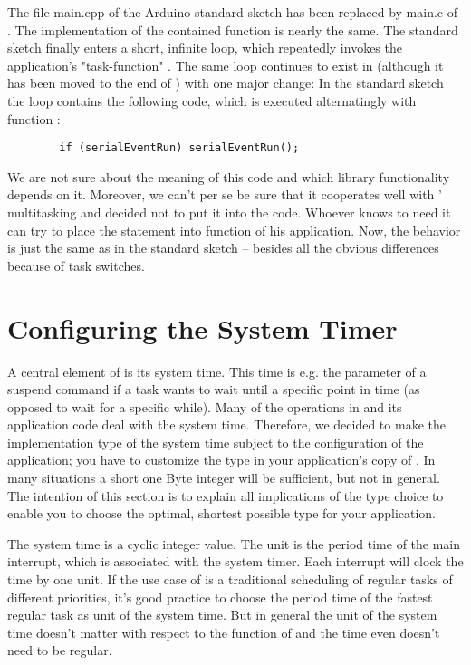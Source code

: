 The file main.cpp of the Arduino standard sketch has been replaced by
main.c of \rtos. The implementation of the contained function 
is nearly the same. The standard sketch finally enters a short, infinite
loop, which repeatedly invokes the application's "task-function"
. The same loop continues to exist in \rtos{} (although it has
been moved to the end of ) with one major change: In
the standard sketch the loop contains the following code, which is
executed alternatingly with function :
\begin{verbatim}
		if (serialEventRun) serialEventRun();
\end{verbatim}
We are not sure about the meaning of this code and which library
functionality depends on it. Moreover, we can't per se be sure that it
cooperates well with \rtos{}' multitasking and decided not to put it into
the \rtos{} code. Whoever knows to need it can try to place the statement
into function  of his \rtos{} application. Now, the behavior
is just the same as in the standard sketch -- besides all the obvious
differences because of task switches.


\section{Configuring the System Timer}
\label{secSystemTimer}

A central element of \rtos{} is its system time. This time is e.g. the
parameter of a suspend command if a task wants to wait until a specific
point in time (as opposed to wait for a specific while). Many of the
operations in \rtos{} and its application code deal with the system time.
Therefore, we decided to make the implementation type of the system time
subject to the configuration of the application; you have to customize the
type in your application's copy of . In many
situations a short one Byte integer will be sufficient, but not in
general. The intention of this section is to explain all implications of
the type choice to enable you to choose the optimal, shortest possible
type for your application.

The system time is a cyclic integer value. The unit is the period time of
the main interrupt, which is associated with the system timer. Each
interrupt will clock the time by one unit. If the use case of \rtos{} is a
traditional scheduling of regular tasks of different priorities, it's good
practice to choose the period time of the fastest regular task as unit of
the system time. But in general the unit of the system time doesn't matter
with respect to the function of \rtos{} and the time even doesn't need to
be regular.

